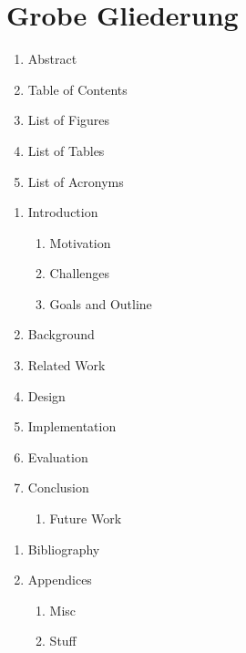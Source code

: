 \chapter{Grobe Gliederung}

\begin{enumerate}[label={}, leftmargin=0.5cm]
	\item Abstract
	\item Table of Contents
	\item List of Figures
	\item List of Tables
	\item List of Acronyms
\end{enumerate}

\begin{enumerate}
\renewcommand{\labelenumi}{\arabic{enumi}}
\renewcommand{\labelenumii}{\arabic{enumi}.\arabic{enumii}}
\renewcommand{\labelenumiii}{\arabic{enumi}.\arabic{enumii}.\arabic{enumiii}}
	\item Introduction
		\begin{enumerate}
			\item Motivation
			\item Challenges
			\item Goals and Outline
		\end{enumerate}
	\item Background
	\item Related Work
	\item Design
	\item Implementation
	\item Evaluation
	\item Conclusion
	\begin{enumerate}
		\item Future Work
	\end{enumerate}
\end{enumerate}

\begin{enumerate}[label={}, leftmargin=0.5cm]
	\item Bibliography
	\item Appendices
	\begin{enumerate}[label=\Alph*, leftmargin=35pt]
		\item Misc
		\item Stuff
	\end{enumerate}
\end{enumerate}
